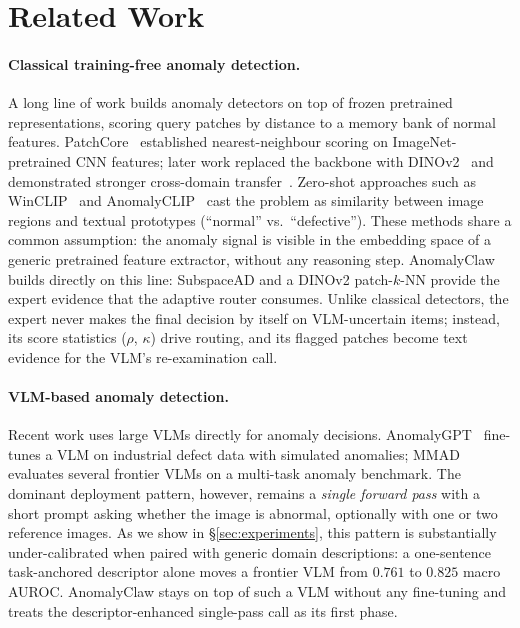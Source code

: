 \section{Related Work}
\label{sec:related_work}

\paragraph{Classical training-free anomaly detection.}
A long line of work builds anomaly detectors on top of frozen pretrained representations, scoring query patches by distance to a memory bank of normal features. PatchCore~\citep{roth2022patchcore} established nearest-neighbour scoring on ImageNet-pretrained CNN features; later work replaced the backbone with DINOv2~\citep{oquab2024dinov2} and demonstrated stronger cross-domain transfer~\citep{subspacead2026}. Zero-shot approaches such as WinCLIP~\citep{jeong2023winclip} and AnomalyCLIP~\citep{zhou2024anomalyclip} cast the problem as similarity between image regions and textual prototypes (``normal'' vs.\ ``defective''). These methods share a common assumption: the anomaly signal is visible in the embedding space of a generic pretrained feature extractor, without any reasoning step. AnomalyClaw builds directly on this line: SubspaceAD and a DINOv2 patch-$k$-NN provide the expert evidence that the adaptive router consumes. Unlike classical detectors, the expert never makes the final decision by itself on VLM-uncertain items; instead, its score statistics ($\rho$, $\kappa$) drive routing, and its flagged patches become text evidence for the VLM's re-examination call.

\paragraph{VLM-based anomaly detection.}
Recent work uses large VLMs directly for anomaly decisions. AnomalyGPT~\citep{gu2024anomalygpt} fine-tunes a VLM on industrial defect data with simulated anomalies; MMAD~\citep{jiang2024mmad} evaluates several frontier VLMs on a multi-task anomaly benchmark. The dominant deployment pattern, however, remains a \emph{single forward pass} with a short prompt asking whether the image is abnormal, optionally with one or two reference images. As we show in \S\ref{sec:experiments}, this pattern is substantially under-calibrated when paired with generic domain descriptions: a one-sentence task-anchored descriptor alone moves a frontier VLM from $0.761$ to $0.825$ macro AUROC. AnomalyClaw stays on top of such a VLM without any fine-tuning and treats the descriptor-enhanced single-pass call as its first phase.

